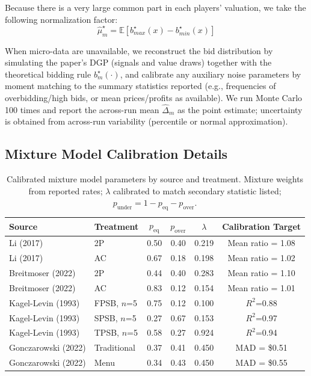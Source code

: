 Because there is a very large common part in each players' valuation, we take the following normalization factor:
\[
{\widehat{\mu}_m^\star} = \mathbb E[b^\star_{max}(x) - b^\star_{min}(x)]
\]

When micro-data are unavailable, we reconstruct the bid distribution by simulating the paper's DGP (signals and value draws) together with the theoretical bidding rule $b_m^\star(\cdot)$, and calibrate any auxiliary noise parameters by moment matching to the summary statistics reported (e.g., frequencies of overbidding/high bids, or mean prices/profits as available). We run Monte Carlo 100 times and report the across-run mean $\widehat{\Delta}_m$ as the point estimate; uncertainty is obtained from across-run variability (percentile or normal approximation).

\subsection{Mixture Model Calibration Details}\label{app:mixture}

\begin{table}[h]
\centering
\small
\begin{tabular}{llcccc}
\toprule
Source & Treatment & $p_{\text{eq}}$ & $p_{\text{over}}$ & $\lambda$ & Calibration Target \\
\midrule
Li (2017) & 2P & 0.50 & 0.40 & 0.219 & Mean ratio = 1.08 \\
Li (2017) & AC & 0.67 & 0.18 & 0.198 & Mean ratio = 1.02 \\
Breitmoser (2022) & 2P & 0.44 & 0.40 & 0.283 & Mean ratio = 1.10 \\
Breitmoser (2022) & AC & 0.83 & 0.12 & 0.154 & Mean ratio = 1.01 \\
Kagel-Levin (1993) & FPSB, $n$=5 & 0.75 & 0.12 & 0.100 & $R^2$=0.88 \\
Kagel-Levin (1993) & SPSB, $n$=5 & 0.27 & 0.67 & 0.153 & $R^2$=0.97 \\
Kagel-Levin (1993) & TPSB, $n$=5 & 0.58 & 0.27 & 0.924 & $R^2$=0.94 \\
Gonczarowski (2022) & Traditional & 0.37 & 0.41 & 0.450 & MAD = \$0.51 \\
Gonczarowski (2022) & Menu & 0.34 & 0.43 & 0.450 & MAD = \$0.55 \\
\bottomrule
\end{tabular}
\caption{Calibrated mixture model parameters by source and treatment. Mixture weights from reported rates; $\lambda$ calibrated to match secondary statistic listed; $p_{\text{under}} = 1 - p_{\text{eq}} -
p_{\text{over}}$.}
\label{tab:calibration}
\end{table}

